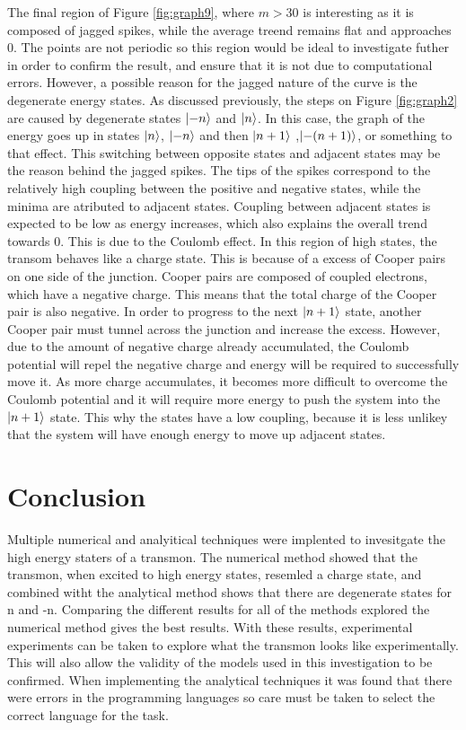 \documentclass[11pt]{article}
\begin{document}
The final region of Figure \ref{fig:graph9}, where $m>30$ is interesting as it is composed of jagged spikes, while the average treend remains flat and approaches 0. The points are not periodic so this region would be ideal to investigate futher in order to confirm the result, and ensure that it is not due to computational errors. However, a possible reason for the jagged nature of the curve is the degenerate energy states. As discussed previously, the steps on Figure \ref{fig:graph2} are caused by degenerate states $\ket{-n}$ and $\ket{n}$. In this case, the graph of the energy  goes up in states  $\ket{n}$, $\ket{-n}$ and then $\ket{n+1}$ ,$\ket{-(n+1)}$, or something to that effect. This switching between opposite states and adjacent states may be the reason behind the jagged spikes. The tips of the spikes correspond to the relatively high coupling between the positive and negative states, while the minima are atributed to adjacent states. Coupling between adjacent states is expected to be low as energy increases, which also explains the overall trend towards 0. This is due to the Coulomb effect. In this region of high states, the transom behaves like a charge state. This is because of a excess of Cooper pairs on one side of the junction. Cooper pairs are composed of coupled electrons, which have a negative charge. This means that the total charge of the Cooper pair is also negative. In order to progress to the next  $\ket{n+1}$ state, another Cooper pair must tunnel across the junction and increase the excess. However, due to the amount of negative charge already accumulated, the Coulomb potential will repel the negative charge and energy will be required to successfully move it. As more charge accumulates, it becomes more difficult to overcome the Coulomb potential and it will require more energy to push the system into the  $\ket{n+1}$ state. This why the states have a low coupling, because it is less unlikey that the system will have enough energy to move up adjacent states.


\section{Conclusion}
Multiple numerical and analyitical techniques were implented to invesitgate the high energy staters of a transmon. The numerical method showed that the transmon, when excited to high energy states, resemled a charge state, and combined witht the analytical method shows that there are degenerate states for n and -n. Comparing the different results for all of the methods explored the numerical method gives the best results. With these results, experimental experiments can be taken to explore what the transmon looks like experimentally. This will also allow the validity of the models used in this investigation to be confirmed.
When implementing the analytical techniques it was found that there were errors in the programming languages so care must be taken to select the correct language for the task.



\appendix
\end{document}
